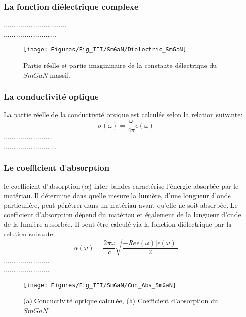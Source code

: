 \subsubsection{La fonction diélectrique complexe}

.................................\\

............................

\begin{figure}[h!]
	\centering
	\texttt{[image: Figures/Fig\_III/SmGaN/Dielectric\_SmGaN]}
	\caption{Partie réelle et partie imagininaire de la constante délectrique du $ SmGaN $ massif.}
	\label{fig:dielectrismgan}
\end{figure}
\FloatBarrier

\subsubsection{La conductivité optique}

La partie réelle de la conductivité optique est calculée selon la relation suivante:
\begin{equation}
	\sigma(\omega)= \frac{\omega}{4\pi}\epsilon(\omega)
\end{equation}
..........................\\
............................

\subsubsection{Le coefficient d'absorption}

le coefficient d'absorption ($\alpha$) inter-bandes caractérise l'énergie absorbée par le matériau. Il détermine dans quelle mesure la lumière, d'une longueur d'onde particulière, peut pénétrer dans un matériau avant qu'elle ne soit absorbée. Le coefficient d'absorption dépend du matériau et également de la longueur d'onde de la lumière absorbée. Il peut être calculé via la fonction diélectrique par la relation suivante:
\begin{equation}
	\alpha(\omega)=\frac{2\pi\omega}{c}\sqrt{\frac{-Re\epsilon(\omega)|\epsilon(\omega)|}{2}}
\end{equation}
........................\\
.........................

\begin{figure}[h!]
	\centering
	\texttt{[image: Figures/Fig\_III/SmGaN/Con\_Abs\_SmGaN]}
	\caption{(a) Conductivité optique calculée, (b) Coefficient d'absorption du $SmGaN$.}
	\label{fig:conabssmgan}
\end{figure}
\FloatBarrier

